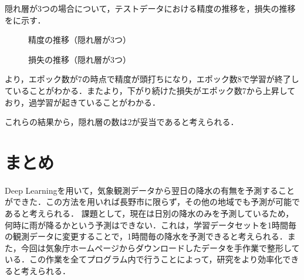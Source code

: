 \documentclass[a4j, 9pt, twocolumn, twoside]{jsarticle}
\begin{document}
	隠れ層が3つの場合について，テストデータにおける精度の推移を，損失の推移をに示す．
	\begin{figure}
		\centering
		\caption{精度の推移（隠れ層が3つ）}
		\label{fig_hidden3_acc}
	\end{figure}
	\begin{figure}
		\centering
		\caption{損失の推移（隠れ層が3つ）}
		\label{fig_hidden3_loss}
	\end{figure}
	より，エポック数が7の時点で精度が頭打ちになり，エポック数8で学習が終了していることがわかる．またより，下がり続けた損失がエポック数7から上昇しており，過学習が起きていることがわかる．

	これらの結果から，隠れ層の数は2が妥当であると考えられる．

\section{まとめ}
	Deep Learningを用いて，気象観測データから翌日の降水の有無を予測することができた．この方法を用いれば長野市に限らず，その他の地域でも予測が可能であると考えられる．
	課題として，現在は日別の降水のみを予測しているため，何時に雨が降るかという予測はできない．これは，学習データセットを1時間毎の観測データに変更することで，1時間毎の降水を予測できると考えられる．また，今回は気象庁ホームページからダウンロードしたデータを手作業で整形している．この作業を全てプログラム内で行うことによって，研究をより効率化できると考えられる．

\begin{thebibliography}{9}
\end{thebibliography}
\end{document}
